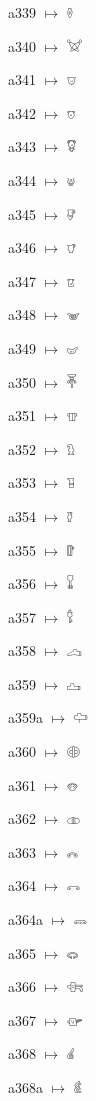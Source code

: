 {\noindent a339 $\mapsto$ {\ahfont 𔖀}\par
\noindent a340 $\mapsto$ {\ahfont 𔖁}\par
\noindent a341 $\mapsto$ {\ahfont 𔖂}\par
\noindent a342 $\mapsto$ {\ahfont 𔖃}\par
\noindent a343 $\mapsto$ {\ahfont 𔖄}\par
\noindent a344 $\mapsto$ {\ahfont 𔖅}\par
\noindent a345 $\mapsto$ {\ahfont 𔖆}\par
\noindent a346 $\mapsto$ {\ahfont 𔖇}\par
\noindent a347 $\mapsto$ {\ahfont 𔖈}\par
\noindent a348 $\mapsto$ {\ahfont 𔖉}\par
\noindent a349 $\mapsto$ {\ahfont 𔖊}\par
\noindent a350 $\mapsto$ {\ahfont 𔖋}\par
\noindent a351 $\mapsto$ {\ahfont 𔖌}\par
\noindent a352 $\mapsto$ {\ahfont 𔖍}\par
\noindent a353 $\mapsto$ {\ahfont 𔖎}\par
\noindent a354 $\mapsto$ {\ahfont 𔖏}\par
\noindent a355 $\mapsto$ {\ahfont 𔖐}\par
\noindent a356 $\mapsto$ {\ahfont 𔖑}\par
\noindent a357 $\mapsto$ {\ahfont 𔖒}\par
\noindent a358 $\mapsto$ {\ahfont 𔖓}\par
\noindent a359 $\mapsto$ {\ahfont 𔖔}\par
\noindent a359a $\mapsto$ {\ahfont 𔖕}\par
\noindent a360 $\mapsto$ {\ahfont 𔖖}\par
\noindent a361 $\mapsto$ {\ahfont 𔖗}\par
\noindent a362 $\mapsto$ {\ahfont 𔖘}\par
\noindent a363 $\mapsto$ {\ahfont 𔖙}\par
\noindent a364 $\mapsto$ {\ahfont 𔖚}\par
\noindent a364a $\mapsto$ {\ahfont 𔖛}\par
\noindent a365 $\mapsto$ {\ahfont 𔖜}\par
\noindent a366 $\mapsto$ {\ahfont 𔖝}\par
\noindent a367 $\mapsto$ {\ahfont 𔖞}\par
\noindent a368 $\mapsto$ {\ahfont 𔖟}\par
\noindent a368a $\mapsto$ {\ahfont 𔖠}\par
}

